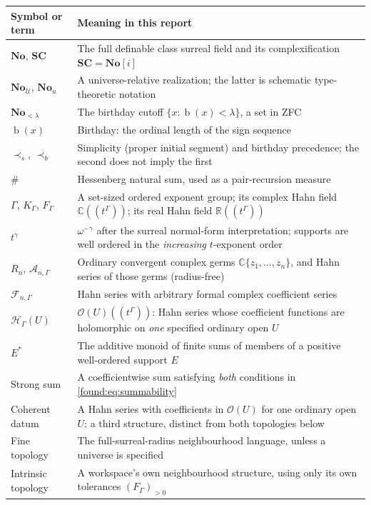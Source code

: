 \documentclass[11pt,letterpaper]{article}
\numberwithin{equation}{section}
\theoremstyle{definition}
\theoremstyle{remark}
\newcommand{\No}{\mathbf{No}}
\newcommand{\SC}{\mathbf{SC}}
\newcommand{\R}{\mathbb R}
\newcommand{\C}{\mathbb C}
\newcommand{\U}{\mathcal U}
\newcommand{\OO}{\mathcal O}
\newcommand{\HH}{\mathcal H}
\newcommand{\Ag}{\mathscr A}
\newcommand{\Fg}{\mathscr F}
\newcommand{\bd}{\operatorname{b}}
\begin{document}
\begin{longtable}{@{}P{0.25\textwidth}P{0.67\textwidth}@{}}
\toprule
Symbol or term & Meaning in this report\\
\midrule\endhead
$\No$, $\SC$ & The full definable class surreal field and its complexification $\SC=\No[i]$\\[0.3em]
$\No_\U$, $\No_u$ & A universe-relative realization; the latter is schematic type-theoretic notation\\[0.3em]
$\No_{<\lambda}$ & The birthday cutoff $\{x:\bd(x)<\lambda\}$, a set in ZFC\\[0.3em]
$\bd(x)$ & Birthday: the ordinal length of the sign sequence\\[0.3em]
$\prec_s$, $\prec_b$ & Simplicity (proper initial segment) and birthday precedence; the second does not imply the first\\[0.3em]
$\mathbin{\#}$ & Hessenberg natural sum, used as a pair-recursion measure\\[0.3em]
$\Gamma$, $K_\Gamma$, $F_\Gamma$ & A set-sized ordered exponent group; its complex Hahn field $\C((t^\Gamma))$; its real Hahn field $\R((t^\Gamma))$\\[0.3em]
$t^\gamma$ & $\omega^{-\gamma}$ after the surreal normal-form interpretation; supports are well ordered in the \emph{increasing} $t$-exponent order\\[0.3em]
$R_n$, $\Ag_{n,\Gamma}$ & Ordinary convergent complex germs $\C\{z_1,\ldots,z_n\}$, and Hahn series of those germs (radius-free)\\[0.3em]
$\Fg_{n,\Gamma}$ & Hahn series with arbitrary formal complex coefficient series\\[0.3em]
$\HH_\Gamma(U)$ & $\OO(U)((t^\Gamma))$: Hahn series whose coefficient functions are holomorphic on \emph{one} specified ordinary open $U$\\[0.3em]
$E^*$ & The additive monoid of finite sums of members of a positive well-ordered support $E$\\[0.3em]
Strong sum & A coefficientwise sum satisfying \emph{both} conditions in \eqref{found:eq:summability}\\[0.3em]
Coherent datum & A Hahn series with coefficients in $\OO(U)$ for one ordinary open $U$; a third structure, distinct from both topologies below\\[0.3em]
Fine topology & The full-surreal-radius neighbourhood language, unless a universe is specified\\[0.3em]
Intrinsic topology & A workspace's own neighbourhood structure, using only its own tolerances $(F_\Gamma)_{>0}$\\[0.3em]

\end{longtable}
\end{document}
